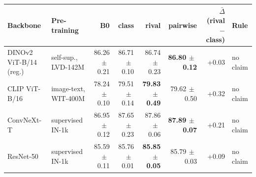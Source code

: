 \begin{tabular}{llrrrrrl}
\toprule
Backbone & Pre-training & B0 & class & rival & pairwise & $\bar\Delta$ (rival$-$class) & Rule \\
\midrule
DINOv2 ViT-B/14 (reg.) & self-sup., LVD-142M & 86.26{\scriptsize$\,\pm\,$0.21} & 86.71{\scriptsize$\,\pm\,$0.10} & 86.74{\scriptsize$\,\pm\,$0.23} & \textbf{86.80{\scriptsize$\,\pm\,$0.12}} & +0.03 & no claim \\
CLIP ViT-B/16 & image-text, WIT-400M & 78.24{\scriptsize$\,\pm\,$0.10} & 79.51{\scriptsize$\,\pm\,$0.14} & \textbf{79.83{\scriptsize$\,\pm\,$0.49}} & 79.62{\scriptsize$\,\pm\,$0.50} & +0.32 & no claim \\
ConvNeXt-T & supervised IN-1k & 86.95{\scriptsize$\,\pm\,$0.12} & 87.65{\scriptsize$\,\pm\,$0.23} & 87.86{\scriptsize$\,\pm\,$0.06} & \textbf{87.89{\scriptsize$\,\pm\,$0.07}} & +0.21 & no claim \\
ResNet-50 & supervised IN-1k & 85.59{\scriptsize$\,\pm\,$0.11} & 85.76{\scriptsize$\,\pm\,$0.01} & \textbf{85.85{\scriptsize$\,\pm\,$0.05}} & 85.79{\scriptsize$\,\pm\,$0.03} & +0.09 & no claim \\
\bottomrule
\end{tabular}

